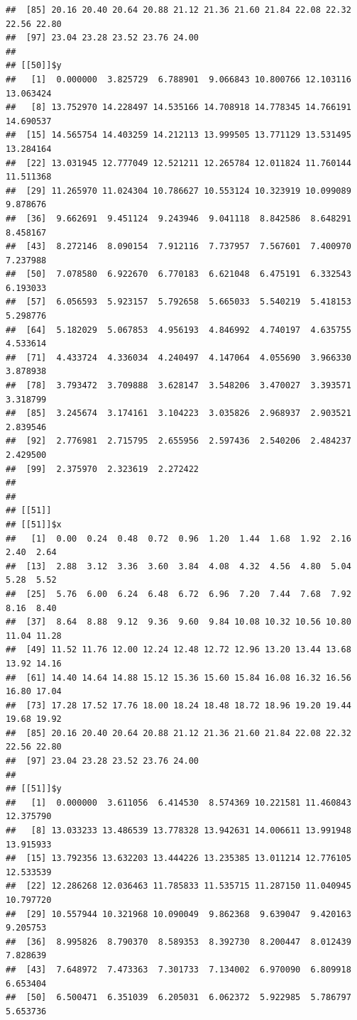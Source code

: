 \documentclass[
  ignorenonframetext,
]{beamer}
\begin{document}
\begin{frame}[fragile]{}
\begin{verbatim}
##  [85] 20.16 20.40 20.64 20.88 21.12 21.36 21.60 21.84 22.08 22.32 22.56 22.80
##  [97] 23.04 23.28 23.52 23.76 24.00
## 
## [[50]]$y
##   [1]  0.000000  3.825729  6.788901  9.066843 10.800766 12.103116 13.063424
##   [8] 13.752970 14.228497 14.535166 14.708918 14.778345 14.766191 14.690537
##  [15] 14.565754 14.403259 14.212113 13.999505 13.771129 13.531495 13.284164
##  [22] 13.031945 12.777049 12.521211 12.265784 12.011824 11.760144 11.511368
##  [29] 11.265970 11.024304 10.786627 10.553124 10.323919 10.099089  9.878676
##  [36]  9.662691  9.451124  9.243946  9.041118  8.842586  8.648291  8.458167
##  [43]  8.272146  8.090154  7.912116  7.737957  7.567601  7.400970  7.237988
##  [50]  7.078580  6.922670  6.770183  6.621048  6.475191  6.332543  6.193033
##  [57]  6.056593  5.923157  5.792658  5.665033  5.540219  5.418153  5.298776
##  [64]  5.182029  5.067853  4.956193  4.846992  4.740197  4.635755  4.533614
##  [71]  4.433724  4.336034  4.240497  4.147064  4.055690  3.966330  3.878938
##  [78]  3.793472  3.709888  3.628147  3.548206  3.470027  3.393571  3.318799
##  [85]  3.245674  3.174161  3.104223  3.035826  2.968937  2.903521  2.839546
##  [92]  2.776981  2.715795  2.655956  2.597436  2.540206  2.484237  2.429500
##  [99]  2.375970  2.323619  2.272422
## 
## 
## [[51]]
## [[51]]$x
##   [1]  0.00  0.24  0.48  0.72  0.96  1.20  1.44  1.68  1.92  2.16  2.40  2.64
##  [13]  2.88  3.12  3.36  3.60  3.84  4.08  4.32  4.56  4.80  5.04  5.28  5.52
##  [25]  5.76  6.00  6.24  6.48  6.72  6.96  7.20  7.44  7.68  7.92  8.16  8.40
##  [37]  8.64  8.88  9.12  9.36  9.60  9.84 10.08 10.32 10.56 10.80 11.04 11.28
##  [49] 11.52 11.76 12.00 12.24 12.48 12.72 12.96 13.20 13.44 13.68 13.92 14.16
##  [61] 14.40 14.64 14.88 15.12 15.36 15.60 15.84 16.08 16.32 16.56 16.80 17.04
##  [73] 17.28 17.52 17.76 18.00 18.24 18.48 18.72 18.96 19.20 19.44 19.68 19.92
##  [85] 20.16 20.40 20.64 20.88 21.12 21.36 21.60 21.84 22.08 22.32 22.56 22.80
##  [97] 23.04 23.28 23.52 23.76 24.00
## 
## [[51]]$y
##   [1]  0.000000  3.611056  6.414530  8.574369 10.221581 11.460843 12.375790
##   [8] 13.033233 13.486539 13.778328 13.942631 14.006611 13.991948 13.915933
##  [15] 13.792356 13.632203 13.444226 13.235385 13.011214 12.776105 12.533539
##  [22] 12.286268 12.036463 11.785833 11.535715 11.287150 11.040945 10.797720
##  [29] 10.557944 10.321968 10.090049  9.862368  9.639047  9.420163  9.205753
##  [36]  8.995826  8.790370  8.589353  8.392730  8.200447  8.012439  7.828639
##  [43]  7.648972  7.473363  7.301733  7.134002  6.970090  6.809918  6.653404
##  [50]  6.500471  6.351039  6.205031  6.062372  5.922985  5.786797  5.653736

\end{verbatim}
\end{frame}
\end{document}
